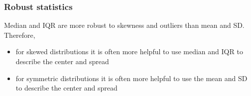 
\begin{frame}
\frametitle{Robust statistics}

Median and IQR are more robust to skewness and outliers than mean and SD. Therefore,

\begin{itemize}
\item for skewed distributions it is often more helpful to use median and IQR to describe the center and spread
\item for symmetric distributions it is often more helpful to use the mean and SD to describe the center and spread
\end{itemize}

$\:$ \\

\pause



\end{frame}


